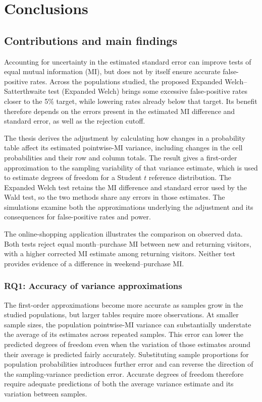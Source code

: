 \chapter{Conclusions}
\label{chap:conclusion}

\section{Contributions and main findings}

Accounting for uncertainty in the estimated standard error can improve
tests of equal mutual information (MI), but does not by itself ensure
accurate false-positive rates. Across the populations studied, the proposed
Expanded Welch--Satterthwaite test (Expanded Welch) brings some excessive
false-positive rates closer to the 5\% target, while lowering rates already
below that target. Its benefit therefore depends on the errors present in
the estimated MI difference and standard error, as well as the rejection
cutoff.

The thesis derives the adjustment by calculating how changes in a
probability table affect its estimated pointwise-MI variance, including
changes in the cell probabilities and their row and column totals. The
result gives a first-order approximation to the sampling variability of
that variance estimate, which is used to estimate degrees of freedom for
a Student \(t\) reference distribution. The Expanded Welch test retains
the MI difference and standard error used by the Wald test, so the two
methods share any errors in those estimates. The simulations examine both
the approximations underlying the adjustment and its consequences for
false-positive rates and power.

The online-shopping application illustrates the comparison on observed
data. Both tests reject equal month--purchase MI between new and returning
visitors, with a higher corrected MI estimate among returning visitors.
Neither test provides evidence of a difference in weekend--purchase MI.

\subsection{RQ1: Accuracy of variance approximations}

The first-order approximations become more accurate as samples grow in
the studied populations, but larger tables require more observations.
At smaller sample sizes, the population pointwise-MI variance can
substantially understate the average of its estimates across repeated
samples. This error can lower the predicted degrees of freedom even when
the variation of those estimates around their average is predicted fairly
accurately. Substituting sample proportions for population probabilities
introduces further error and can reverse the direction of the sampling-variance
prediction error. Accurate degrees of freedom therefore require adequate
predictions of both the average variance estimate and its variation between
samples.

